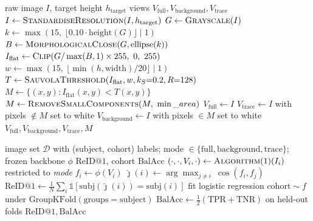 \documentclass[3p,final,10pt]{elsarticle}
\begin{document}
\begin{algorithm}[H]
\caption{Masked-view construction (\texttt{get\_trace\_mask},
Section~\ref{sec:masking})}
\label{alg:mask}
\begin{algorithmic}[1]
\Require raw image $I$, target height $h_{\mathrm{target}}$
\Ensure views $V_{\mathrm{full}}, V_{\mathrm{background}}, V_{\mathrm{trace}}$
\State $I \gets \Call{StandardiseResolution}{I, h_{\mathrm{target}}}$ 
\State $G \gets \Call{Grayscale}{I}$
\State $k \gets \max(15,\ \lfloor 0.10 \cdot \mathrm{height}(G) \rfloor \mid 1)$
\State $B \gets \Call{MorphologicalClose}{G, \text{ellipse}(k)}$
\State $I_{\mathrm{flat}} \gets \Call{Clip}{G / \max(B,1) \times 255,\ 0,\ 255}$ 
\State $w \gets \max(15,\ \lfloor \min(h,\mathrm{width})/20 \rfloor \mid 1)$
\State $T \gets \Call{SauvolaThreshold}{I_{\mathrm{flat}}, w, k_S{=}0.2, R{=}128}$ 
\State $M \gets \{(x,y) : I_{\mathrm{flat}}(x,y) < T(x,y)\}$
\State $M \gets \Call{RemoveSmallComponents}{M,\ \min\_area}$ 
\State $V_{\mathrm{full}} \gets I$
\State $V_{\mathrm{trace}} \gets I$ with pixels $\notin M$ set to white
\State $V_{\mathrm{background}} \gets I$ with pixels $\in M$ set to white
\State \Return $V_{\mathrm{full}}, V_{\mathrm{background}}, V_{\mathrm{trace}}, M$
\end{algorithmic}
\end{algorithm}

\begin{algorithm}[H]
\caption{Signal-localisation probe (\texttt{leak\_decomposition\_probe.py},
Section~\ref{sec:probe})}
\label{alg:probe}
\begin{algorithmic}[1]
\Require image set $\mathcal{D}$ with (subject, cohort) labels; mode $\in
\{\mathrm{full}, \mathrm{background}, \mathrm{trace}\}$; frozen backbone
$\phi$
\Ensure $\mathrm{ReID@1}$, cohort $\mathrm{BalAcc}$
  \State $(\cdot,\cdot,V_i,\cdot) \gets \Call{Algorithm}{1}(I_i)$ restricted to \textit{mode}
  \State $f_i \gets \phi(V_i)$ 
\EndFor
{}
  \State $\hat\jmath(i) \gets \arg\max_{j\neq i}\ \cos(f_i, f_j)$ 
\EndFor
\State $\mathrm{ReID@1} \gets \frac{1}{N}\sum_i \mathbb{1}[\mathrm{subj}(\hat\jmath(i)){=}\mathrm{subj}(i)]$
\State fit logistic regression $\mathrm{cohort} \sim f$ under
       $\mathrm{GroupKFold}(\mathrm{groups}{=}\mathrm{subject})$
\State $\mathrm{BalAcc} \gets \tfrac{1}{2}(\mathrm{TPR}+\mathrm{TNR})$ on held-out folds
\State \Return $\mathrm{ReID@1}, \mathrm{BalAcc}$
\end{algorithmic}
\end{algorithm}
\end{document}

